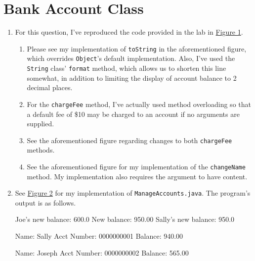 \documentclass[leqno, 11pt]{article}
\newcommand{\iftcodefigure}[3]{%
  \begin{codefigure}
    \label{#1}
    \addtocounter{figure}{-1}
    
  \end{codefigure}
}
\begin{document}
\section{Bank Account Class}
\begin{enumerate}
  \item For this question, I've reproduced the code provided in the lab in \hyperref[fig:one]{Figure 1}.
        \begin{enumerate}[label=\alph*.]
          \item Please see my implementation of \texttt{toString} in the aforementioned figure, which overrides \texttt{Object}'s default implementation. Also, I've used the \texttt{String} class' \texttt{format} method, which allows us to shorten this line somewhat, in addition to limiting the display of account balance to 2 decimal places.
          \item For the \texttt{chargeFee} method, I've actually used method overloading so that a default fee of \$10 may be charged to an account if no arguments are supplied.
          \item See the aforementioned figure regarding changes to both \texttt{chargeFee} methods.
          \item See the aforementioned figure for my implementation of the \texttt{changeName} method. My implementation also requires the argument to have content.
        \end{enumerate}
  \item See \hyperref[fig:two]{Figure 2} for my implementation of \texttt{ManageAccounts.java}. The program's output is as follows.
        \begin{verbbox}[\mbox{}\scriptsize]
Joe's new balance: 600.0
New balance: 950.00
Sally's new balance: 950.0

Name: Sally
Acct Number: 0000000001
Balance: 940.00

Name: Joseph
Acct Number: 0000000002
Balance: 565.00
        \end{verbbox}
        \begin{center}
          \theverbbox
        \end{center}
\end{enumerate}
\iftcodefigure{fig:one}{Account.java}{%
  /home/brandon/eclipse-workspace/ift_194_labs/src/lab_3/Account.java}
\iftcodefigure{fig:two}{ManageAccounts.java}{%
  /home/brandon/eclipse-workspace/ift_194_labs/src/lab_3/ManageAccounts.java}
\end{document}
